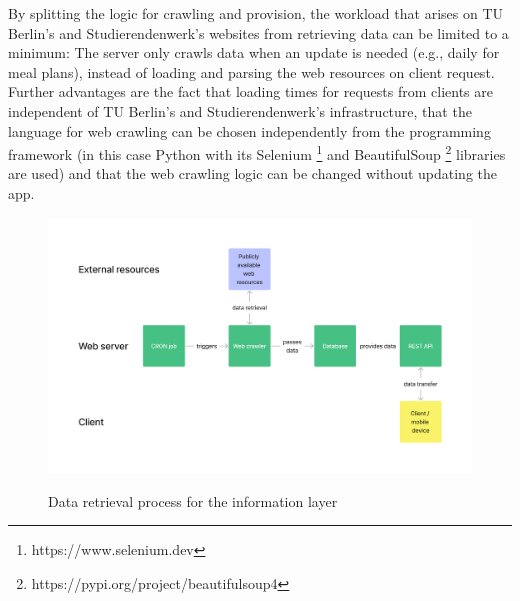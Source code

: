 By splitting the logic for crawling and provision, the workload that arises on TU Berlin's and Studierendenwerk's websites from retrieving data can be limited to a minimum: The server only crawls data when an update is needed (e.g., daily for meal plans), instead of loading and parsing the web resources on client request. Further advantages are the fact that loading times for requests from clients are independent of TU Berlin's and Studierendenwerk's infrastructure, that the language for web crawling can be chosen independently from the programming framework (in this case Python with its Selenium \footnote{https://www.selenium.dev} and BeautifulSoup \footnote{https://pypi.org/project/beautifulsoup4} libraries are used) and that the web crawling logic can be changed without updating the app.

\begin{figure}[H]
	\centering
	\includegraphics[width=1.0\textwidth]{images/data_retrieval_process.png}\\
	\caption{Data retrieval process for the information layer}
    \label{fig:summary_data_retrieval}
\end{figure}


